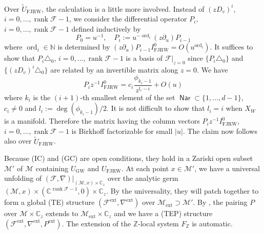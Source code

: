 \documentclass[11pt]{amsart}
\theoremstyle{definition} %
\theoremstyle{remark} %
\newcommand{\CC}{\mathbb C}
\newcommand{\NN}{\mathbb N}
\newcommand{\ZZ}{\mathbb Z}
\def\GW{\operatorname{\text{GW}}}
\newcommand{\cM}{\mathcal{M}}
\newcommand{\cF}{\mathcal{F}}
\newcommand{\Nar}{\operatorname{\mathsf{Nar}}}
\newcommand{\ext}{{\operatorname{ext}}}
\newcommand{\FJRW}{{\operatorname{FJRW}}}
\renewcommand{\GW}{{\operatorname{GW}}}
\newcommand{\rank}{\operatorname{rank}}
\newcommand{\ord}{\operatorname{ord}}
\newcommand{\tU}{\widetilde{U}}
\begin{document}
Over $\tU_{\FJRW}$, the calculation is a little more involved. 
Instead of $(zD_v)^i$, $i=0,\dots,\rank \cF-1$, 
we consider the differential operator 
$P_i$, $i=0,\dots,\rank \cF-1$ defined inductively by 
\[
P_0 = u^{-1}, \quad P_i := u^{-\ord_i} (z \partial_u)P_{i-1} 
\]
where $\ord_i\in \NN$ is determined by 
$(z\partial_u) P_{i-1} I_{\FJRW}^0 = O(u^{\ord_i})$. 
It suffices to show that $P_i \triangle_0$, $i=0,\dots,\rank \cF-1$ 
is a basis of $\cF|_{z=0}$ since 
$\{P_i \triangle_0\}$ and $\{(zD_v)^i \triangle_0\}$ 
are related by an invertible matrix along $z=0$. 
We have   
\[
P_i z^{-1} I^0_{\FJRW} = c_{i} \frac{\phi_{k_i-1}}{z^{l_i-i}} 
+ O(u) 
\]
where $k_i$ is the $(i+1)$-th smallest element 
of the set $\Nar\subset \{1,\dots,d-1\}$, 
$c_i \neq 0$ 
and $l_i := \deg (\phi_{k_i-1})/2$. 
It is not difficult to show that $l_i = i$ 
when $X_W$ is a manifold. 
Therefore the matrix having the column vectors 
$P_i z^{-1} I_{\FJRW}^0$, $i=0,\dots,\rank \cF-1$ 
is Birkhoff factorizable for small $|u|$. 
The claim now follows 
also over $\tU_{\FJRW}$.  

Because (IC) and (GC) are open conditions, 
they hold in a Zariski open subset $\cM'$ of $\cM$ 
containing $U_\GW$ and $U_{\FJRW}$. 
At each point $x\in \cM'$,  
we have a universal unfolding \cite[Definition 2.3]{Hertling-Manin} 
of $(\cF,\nabla)|_{(\cM,x)\times \CC_z}$ 
over the analytic germ 
$(\cM,x) \times (\CC^{\rank \cF-1}, 0)\times \CC_z$.  
By the universality, they will patch together to 
form a global (TE) structure $(\cF^\ext, \nabla^\ext)$ 
over $\cM_\ext \supset \cM'$. 
By \cite[Lemma 3.2]{Hertling-Manin}, the pairing 
$P$ over $\cM\times \CC_z$ extends to $\cM_\ext \times \CC_z$ 
and we have a (TEP) structure $(\cF^\ext, \nabla^\ext,P^\ext)$. 
The extension of the $\ZZ$-local system $F_\ZZ$ is automatic.  
\end{document}
